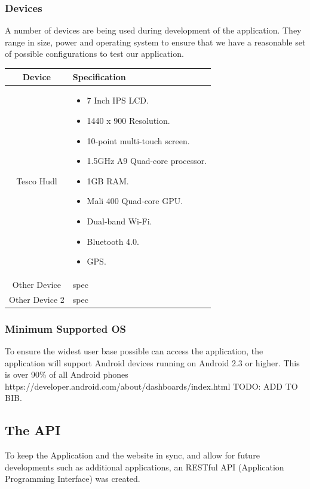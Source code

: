 \documentclass[11pt,a4paper]{article}
\begin{document}
\subsubsection{Devices}
A number of devices are being used during development of the application. They range in size, power and operating system to ensure that we have a reasonable set of possible configurations to test our application.

\begin{center}
\begin{tabular}{c|p{8cm}}
\textbf{Device} & \textbf{Specification} \\ \hline
Tesco Hudl & \begin{itemize}
\item 7 Inch IPS LCD.
\item 1440 x 900 Resolution.
\item 10-point multi-touch screen.
\item 1.5GHz A9 Quad-core processor.
\item 1GB RAM.
\item Mali 400 Quad-core GPU.
\item Dual-band Wi-Fi.
\item Bluetooth 4.0.
\item GPS.
\end{itemize} \\ \hline
Other Device & spec \\ \hline
Other Device 2 & spec \\ \hline

\end{tabular}
\end{center}

\subsubsection{Minimum Supported OS}
To ensure the widest user base possible can access the application, the application will support Android devices running on Android 2.3 or higher. This is over 90\% of all Android phones https://developer.android.com/about/dashboards/index.html TODO: ADD TO BIB.

\subsection{The API}
\label{sec:techAPI}
To keep the Application and the website in sync, and allow for future developments such as additional applications, an RESTful API (Application Programming Interface) was created.
\end{document}
